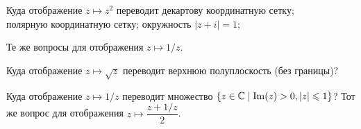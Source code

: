 \documentclass[a4paper,12pt]{article}
\begin{document}
Куда отображение $z\longmapsto z^2$ переводит
декартову координатную сетку;\\
полярную координатную сетку;
окружность $|z+i|=1$;

 Те же вопросы для отображения
$z\longmapsto 1/z$.

Куда отображение $z\longmapsto\sqrt z$ переводит верхнюю полуплоскость (без границы)?

Куда отображение $z\longmapsto1/z$ переводит множество $\{z\in\mathbb{C}\mid\mathop{\mathrm{Im}}(z)>0,|z|\leqslant1\}$?
Тот же вопрос для отображения $z\longmapsto\dfrac{z + 1/z}{2}$.


{}
\end{document}
